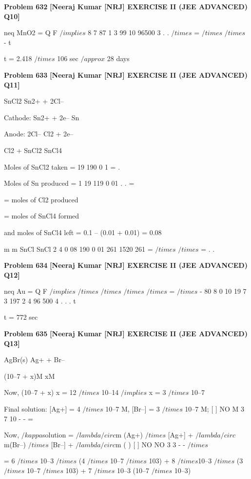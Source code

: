 \begin{problembox}
\textbf{Problem 632} \hfill \textbf{[Neeraj Kumar [NRJ] EXERCISE II (JEE ADVANCED) Q10]}
\label{q:ext-nrj_all_questions-632}

neq MnO2 = Q
F $/implies$ 8 7
87
1
3 99 10
96500
3
.
.
$/times$ =
$/times$
$/times$
-
t
 
   t = 2.418 $/times$ 106 sec $/approx$ 28 days
\end{problembox}

\begin{problembox}
\textbf{Problem 633} \hfill \textbf{[Neeraj Kumar [NRJ] EXERCISE II (JEE ADVANCED) Q11]}
\label{q:ext-nrj_all_questions-633}

SnCl2 
 Sn2+ + 2Cl--
 
 Cathode: Sn2+ + 2e-- 
 Sn
 
 Anode: 2Cl-- 
 Cl2 + 2e--
 
  
Cl2 + SnCl2 
 SnCl4
 
 Moles of SnCl2 taken = 19
190
0 1
= . 
 
 Moles of Sn produced = 1 19
119
0 01
.
.
=
 
                                   = moles of Cl2 produced
 
  
                           = moles of SnCl4 formed
 
 and moles of SnCl4 left = 0.1 -- (0.01 + 0.01) = 0.08
 
   
m
m
SnCl
SnCl
2
4
0 08 190
0 01 261
1520
261
=
$/times$
$/times$
=
.
.
\end{problembox}

\begin{problembox}
\textbf{Problem 634} \hfill \textbf{[Neeraj Kumar [NRJ] EXERCISE II (JEE ADVANCED) Q12]}
\label{q:ext-nrj_all_questions-634}

neq Au = Q
F $/implies$
$/times$
$/times$
$/times$
$/times$
=
$/times$
-
80 8 0 10
19 7 3
197
2 4
96 500
4
.
.
.
t 
 
   t = 772 sec
\end{problembox}

\begin{problembox}
\textbf{Problem 635} \hfill \textbf{[Neeraj Kumar [NRJ] EXERCISE II (JEE ADVANCED) Q13]}
\label{q:ext-nrj_all_questions-635}

AgBr(s)              Ag+      +                Br--
 
                                (10--7 + x)M              xM
 
 Now, (10--7 + x) x = 12 $/times$ 10--14 $/implies$ x = 3 $/times$ 10--7
 
 Final solution: [Ag+] = 4 $/times$ 10--7 M, [Br--] = 3 $/times$ 10--7 
M; [
]
NO
M
3
7
10
-
-
=
 
 Now, $/kappa$solution = $/lambda$$/circ$m (Ag+) $/times$ [Ag+] + $/lambda$$/circ$m(Br--) $/times$ 
[Br--] + $/lambda$$/circ$m (
)
[
]
NO
NO
3
3
-
-
$/times$
 
 
 =  6 $/times$ 10--3 $/times$ (4 $/times$ 10--7 $/times$ 103) + 8 $/times$10--3 $/times$ (3 $/times$ 10--7 $/times$ 
103) + 7 $/times$ 10--3 (10--7 $/times$ 10--3)
\end{problembox}


